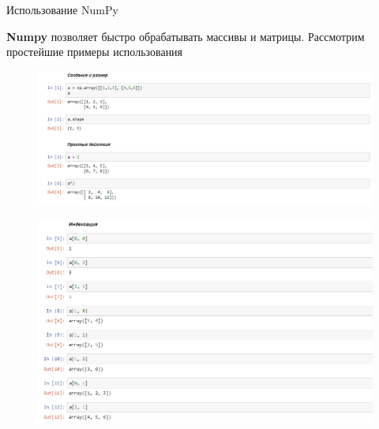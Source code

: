 \documentclass[8pt,pdf,hyperref={unicode}, xcolor=dvipsnames, fleqn]{beamer}
\begin{document}
\begin{frame}{Использование NumPy}

\textbf{Numpy} позволяет быстро обрабатывать массивы и матрицы. Рассмотрим простейшие примеры использования

\begin{figure}
	\includegraphics[width=1.0\textwidth]{Images/main1.png}
\end{figure}

\end{frame}
\begin{frame}{}


\begin{figure}
	\includegraphics[width=1.0\textwidth]{Images/main2.png}
\end{figure}

\end{frame}
\end{document}
